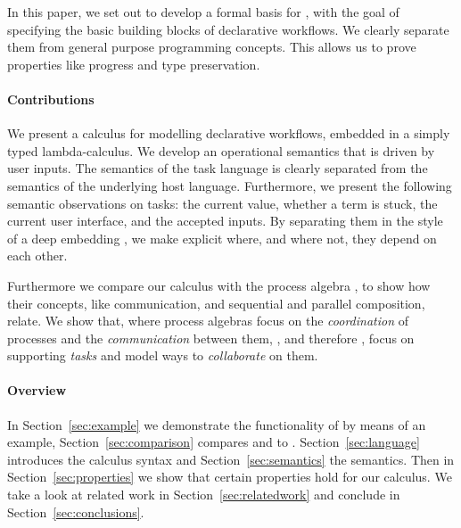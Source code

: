 
In this paper, we set out to develop a formal basis for \TOP, with the goal of specifying the basic building blocks of declarative workflows.
We clearly separate them from general purpose programming concepts.
This allows us to prove properties like progress and type preservation.



\paragraph{Contributions}

We present a calculus for modelling declarative workflows, embedded in a simply typed lambda-calculus.
We develop an operational semantics that is driven by user inputs.
The semantics of the task language is clearly separated from the semantics of the underlying host language.
Furthermore, we present the following semantic observations on tasks: the current value, whether a term is stuck, the current user interface, and the accepted inputs.
By separating them in the style of a deep embedding \cite{conf/cefp/Gibbons13}, we make explicit where, and where not, they depend on each other.

Furthermore we compare our calculus with the process algebra \CSP, to show how their concepts, like communication, and sequential and parallel composition, relate.
We show that, where process algebras focus on the \emph{coordination} of processes and the \emph{communication} between them,
\TOP, and therefore \TOPHAT, focus on supporting \emph{tasks} and model ways to \emph{collaborate} on them.



\paragraph{Overview}

In Section~\ref{sec:example} we demonstrate the functionality of \TOPHAT by means of an example,
Section~\ref{sec:comparison} compares \TOP and \TOPHAT to \CSP.
Section~\ref{sec:language} introduces the \TOPHAT calculus syntax
and Section~\ref{sec:semantics} the semantics.
Then in Section~\ref{sec:properties} we show that certain properties hold for our calculus.
We take a look at related work in Section~\ref{sec:relatedwork}
and conclude in Section~\ref{sec:conclusions}.
